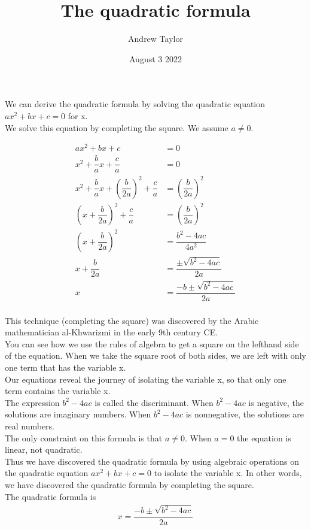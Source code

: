 \documentclass{article}
\title{The quadratic formula}
\author{Andrew Taylor}
\date{August 3 2022}
\begin{document}
\maketitle

We can derive the quadratic formula by solving the quadratic equation $ax^2 + bx + c = 0$ for x. \\

We solve this equation by completing the square. We assume $a \neq 0$.

\begin{align*}
ax^2 + bx + c &= 0 \\
x^2 + \dfrac{b}{a}x + \dfrac{c}{a} &= 0 \\
x^2 + \dfrac{b}{a}x + \left(\dfrac{b}{2a}\right)^2 + \dfrac{c}{a} &= \left(\dfrac{b}{2a}\right)^2 \\
\left(x + \dfrac{b}{2a}\right)^2 + \dfrac{c}{a} &= \left(\dfrac{b}{2a}\right)^2 \\
\left(x + \dfrac{b}{2a}\right)^2 &= \dfrac{b^2 - 4ac}{4a^2} \\
x + \dfrac{b}{2a} &= \dfrac{\pm \sqrt{b^2 - 4ac}}{2a} \\
x &= \dfrac{-b \pm \sqrt{b^2 - 4ac}}{2a} \\
\end{align*}

This technique (completing the square) was discovered by the Arabic mathematician al-Khwarizmi in the early 9th century CE. \\

You can see how we use the rules of algebra to get a square on the lefthand side of the equation. When we take the square root of both sides, we are left with only one term that has the variable x. \\

Our equations reveal the journey of isolating the variable x, so that only one term contains the variable x. \\

The expression $b^2 - 4ac$ is called the discriminant. When $b^2 - 4ac$ is negative, the solutions are imaginary numbers. When $b^2 - 4ac$ is nonnegative, the solutions are real numbers. \\

The only constraint on this formula is that $a \neq 0$. When $a = 0$ the equation is linear, not quadratic. \\

Thus we have discovered the quadratic formula by using algebraic operations on the quadratic equation $ax^2 + bx + c = 0$ to isolate the variable x. In other words, we have discovered the quadratic formula by completing the square. \\

The quadratic formula is \begin{align*}x = \dfrac{-b \pm \sqrt{b^2 - 4ac}}{2a}\end{align*}
\end{document}
